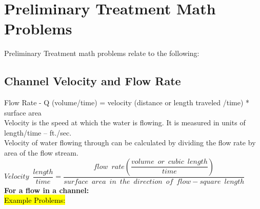 \section{Preliminary Treatment Math Problems}

Preliminary Treatment math problems relate to the following:

\subsection{Channel Velocity and Flow Rate}
Flow Rate - Q (volume/time) = velocity (distance or length traveled /time) * surface area\\
Velocity is the speed at which the water is flowing.  It is measured in units of length/time – ft./sec.\\
Velocity of water flowing through can be calculated by dividing the flow rate by area of the flow stream.\\
\vspace{0.5cm}
$Velocity \enspace \dfrac{length}{time}= \dfrac{flow \enspace rate(\dfrac{volume \enspace or \enspace cubic \enspace length}{time})}{surface \enspace area \enspace in \enspace the \enspace direction \enspace of \enspace flow-square \enspace length}$\\
\vspace{0.5cm}
\textbf{For a flow in a channel:}\\
\vspace{0.5cm}
\hl{Example Problems:}\\
